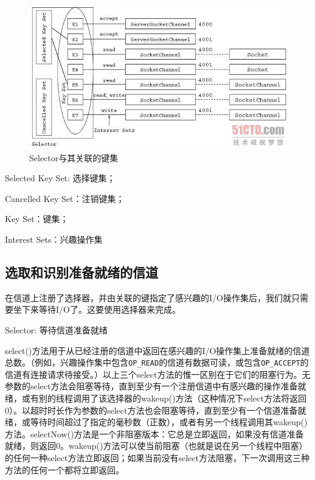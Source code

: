 		\begin{figure}[htbp]%
			\centering
			\includegraphics[scale=.6]{img/05.01.jpg}
			\caption{Selector与其关联的键集}
			\label{fig:selector.and.its.key.set}
		\end{figure}

		Selected Key Set: 选择键集； 

		Cancelled Key Set：注销键集； 

		Key Set：键集；

		Interest Sets：兴趣操作集 

	\subsection{选取和识别准备就绪的信道}

		在信道上注册了选择器，并由关联的键指定了感兴趣的I/O操作集后，我们就只需要坐下来等待I/O了。这要使用选择器来完成。

		Selector: 等待信道准备就绪

		

	select()方法用于从已经注册的信道中返回在感兴趣的I/O操作集上准备就绪的信道总数。（例如，兴趣操作集中包含\verb|OP_READ|的信道有数据可读，或包含\verb|OP_ACCEPT|的信道有连接请求待接受。）以上三个select方法的惟一区别在于它们的阻塞行为。无参数的select方法会阻塞等待，直到至少有一个注册信道中有感兴趣的操作准备就绪，或有别的线程调用了该选择器的wakeup()方法（这种情况下select方法将返回0）。以超时时长作为参数的select方法也会阻塞等待，直到至少有一个信道准备就绪，或等待时间超过了指定的毫秒数（正数），或者有另一个线程调用其wakeup()方法。selectNow()方法是一个非阻塞版本：它总是立即返回，如果没有信道准备就绪，则返回0。wakeup()方法可以使当前阻塞（也就是说在另一个线程中阻塞）的任何一种select方法立即返回；如果当前没有select方法阻塞，下一次调用这三种方法的任何一个都将立即返回。

